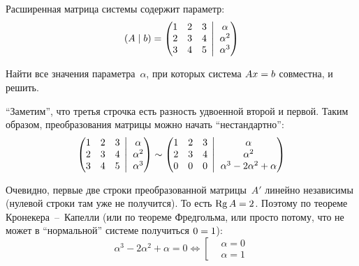 \documentclass[a4paper,12pt]{article}
\newcommand{\BigMiddleThree}{\;\left|\vphantom{\begin{pmatrix} 0\\0\\0 \end{pmatrix}}\right.\;}
\begin{document}
  Расширенная матрица системы содержит параметр:
  \[
    (A \mid b) = \left(
      \begin{matrix}
        1 & 2 & 3\\
        2 & 3 & 4\\
        3 & 4 & 5
      \end{matrix}
      \BigMiddleThree
      \begin{matrix}
        \alpha\\
        \alpha^2\\
        \alpha^3
      \end{matrix}
    \right)
  \]

  Найти все значения параметра~$\alpha$, при которых система $Ax \hm= b$ совместна, и решить.
  
  \begin{solution}
    ``Заметим'', что третья строчка есть разность удвоенной второй и первой.
    Таким образом, преобразования матрицы можно начать ``нестандартно'':
    \[
      \left(
        \begin{matrix}
          1 & 2 & 3\\
          2 & 3 & 4\\
          3 & 4 & 5
        \end{matrix}
        \BigMiddleThree
        \begin{matrix}
          \alpha\\
          \alpha^2\\
          \alpha^3
        \end{matrix}
      \right)
      \sim \left(
        \begin{matrix}
          1 & 2 & 3\\
          2 & 3 & 4\\
          0 & 0 & 0
        \end{matrix}
        \BigMiddleThree
        \begin{matrix}
          \alpha\\
          \alpha^2\\
          \alpha^3 - 2\alpha^2 + \alpha
        \end{matrix}
      \right)
    \]

    Очевидно, первые две строки преобразованной матрицы~$A'$ линейно независимы (нулевой строки там уже не получится).
    То есть $\Rg A \hm= 2$.
    Поэтому по теореме Кронекера~--~Капелли (или по теореме Фредгольма, или просто потому, что не может в ``нормальной'' системе получиться $0 \hm= 1$):
    \[
      \alpha^3 - 2\alpha^2 + \alpha = 0
      \Leftrightarrow \left[
        \begin{aligned}
          &\alpha = 0\\
          &\alpha = 1
        \end{aligned}
      \right.
    \]


\end{solution}
\end{document}
